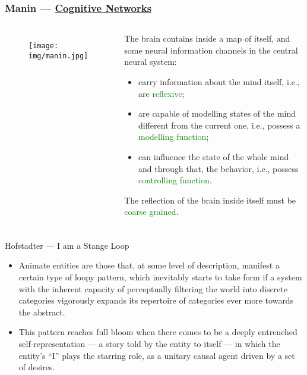 \documentclass[UTF8,11pt,colorlinks,compress,openany]{beamer}%
\begin{document}
\begin{frame}\frametitle{Manin --- \href{https://arxiv.org/abs/1709.03114}{Cognitive Networks}}
\begin{columns}
\begin{figure}[H]
\texttt{[image: img/manin.jpg]}
\end{figure}
\begin{block}{}
The brain contains inside a map of itself, and some neural information channels in the central neural system:
\begin{itemize}
	\item carry information about the mind itself, i.e., are \textcolor{green}{reflexive};
	\item are capable of modelling states of the mind different from the current one, i.e., possess a \textcolor{green}{modelling function};
	\item can influence the state of the whole mind and through that, the behavior, i.e., possess \textcolor{green}{controlling function}.
\end{itemize}
The reflection of the brain inside itself must be \textcolor{green}{coarse grained}.
\end{block}
\end{columns}
\end{frame}

\begin{frame}\frametitle{}
\begin{block}{Hofstadter --- I am a Stange Loop}
\begin{itemize}
	\item Animate entities are those that, at some level of description, manifest a certain type of loopy pattern, which inevitably starts to take form if a system with the inherent capacity of perceptually filtering the world into discrete categories vigorously expands its repertoire of categories ever more towards the abstract.
	\item This pattern reaches full bloom when there comes to be a deeply entrenched self-representation --- a story told by the entity to itself --- in which the entity's ``I'' plays the starring role, as a unitary causal agent driven by a set of desires.
\end{itemize}
\end{block}
\begin{figure}[H]
\end{figure}
\end{frame}
\end{document}
